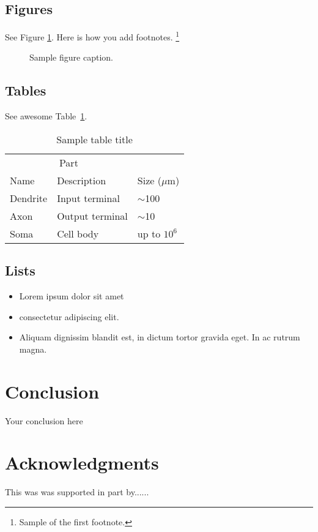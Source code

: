 \documentclass{article}
\begin{document}
\subsection{Figures}
\lipsum[10] 
See Figure \ref{fig:fig1}. Here is how you add footnotes. \footnote{Sample of the first footnote.}
\lipsum[11] 

\begin{figure}
  \centering
  \fbox{\rule[-.5cm]{4cm}{4cm} \rule[-.5cm]{4cm}{0cm}}
  \caption{Sample figure caption.}
  \label{fig:fig1}
\end{figure}

\subsection{Tables}
\lipsum[12]
See awesome Table~\ref{tab:table}.

\begin{table}
 \caption{Sample table title}
  \centering
  \begin{tabular}{lll}
    \toprule
    \multicolumn{2}{c}{Part}                   \\
    \cmidrule(r){1-2}
    Name     & Description     & Size ($\mu$m) \\
    \midrule
    Dendrite & Input terminal  & $\sim$100     \\
    Axon     & Output terminal & $\sim$10      \\
    Soma     & Cell body       & up to $10^6$  \\
    \bottomrule
  \end{tabular}
  \label{tab:table}
\end{table}

\subsection{Lists}
\begin{itemize}
\item Lorem ipsum dolor sit amet
\item consectetur adipiscing elit. 
\item Aliquam dignissim blandit est, in dictum tortor gravida eget. In ac rutrum magna.
\end{itemize}


\section{Conclusion}
Your conclusion here

\section*{Acknowledgments}
This was was supported in part by......

  
  
\end{document}
